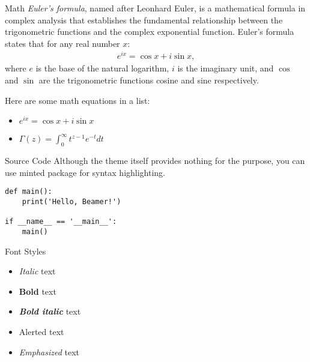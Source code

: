 \documentclass[t]{beamer}  %
\begin{document}
\begin{frame}[fragile]{Math}
  \emph{Euler's formula}, named after Leonhard Euler, is a mathematical formula
  in complex analysis that establishes the fundamental relationship between the
  trigonometric functions and the complex exponential function. Euler's formula
  states that for any real number $x$:
  \begin{align}
    e^{ix} = \cos x + i\sin x,
  \end{align}
  where $e$ is the base of the natural logarithm, $i$ is the imaginary unit,
  and $\cos$ and $\sin$ are the trigonometric functions cosine and sine
  respectively.

  Here are some math equations in a list:
  \begin{itemize}
    \item $e^{ix} = \cos x + i \sin x$
    \item $\Gamma(z) = \int_0^\infty t^{z-1} e^{-t} dt$
  \end{itemize}
\end{frame}


\begin{frame}[fragile]{Source Code}
  Although the theme itself provides nothing for the purpose,
  you can use \alert{minted} package for syntax highlighting.

  \begin{verbatim}
def main():
    print('Hello, Beamer!')

if __name__ == '__main__':
    main()
  \end{verbatim}
\end{frame}


\begin{frame}{Font Styles}
  \begin{itemize}
  \item \textit{Italic} text
  \item \textbf{Bold} text
  \item \textit{\textbf{Bold italic}} text
  \item \alert{Alerted} text
  \item \emph{Emphasized} text
  \end{itemize}
\end{frame}
\end{document}

